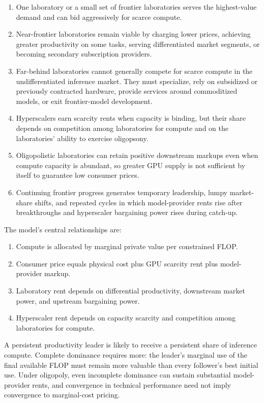 \documentclass[11pt]{article}
\begin{document}
\begin{enumerate}
\item One laboratory or a small set of frontier laboratories serves the highest-value demand and can bid aggressively for scarce compute.
\item Near-frontier laboratories remain viable by charging lower prices, achieving greater productivity on some tasks, serving differentiated market segments, or becoming secondary subscription providers.
\item Far-behind laboratories cannot generally compete for scarce compute in the undifferentiated inference market. They must specialize, rely on subsidized or previously contracted hardware, provide services around commoditized models, or exit frontier-model development.
\item Hyperscalers earn scarcity rents when capacity is binding, but their share depends on competition among laboratories for compute and on the laboratories' ability to exercise oligopsony.
\item Oligopolistic laboratories can retain positive downstream markups even when compute capacity is abundant, so greater GPU supply is not sufficient by itself to guarantee low consumer prices.
\item Continuing frontier progress generates temporary leadership, lumpy market-share shifts, and repeated cycles in which model-provider rents rise after breakthroughs and hyperscaler bargaining power rises during catch-up.
\end{enumerate}

The model's central relationships are:

\begin{enumerate}[label=\textbf{\arabic*.}]
\item Compute is allocated by marginal private value per constrained FLOP.
\item Consumer price equals physical cost plus GPU scarcity rent plus model-provider markup.
\item Laboratory rent depends on differential productivity, downstream market power, and upstream bargaining power.
\item Hyperscaler rent depends on capacity scarcity and competition among laboratories for compute.
\end{enumerate}

A persistent productivity leader is likely to receive a persistent share of inference compute. Complete dominance requires more: the leader's marginal use of the final available FLOP must remain more valuable than every follower's best initial use. Under oligopoly, even incomplete dominance can sustain substantial model-provider rents, and convergence in technical performance need not imply convergence to marginal-cost pricing.
\end{document}

